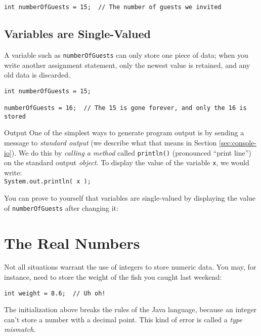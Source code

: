 \begin{verbatim}
int numberOfGuests = 15;  // The number of guests we invited
\end{verbatim}

\subsection{Variables are Single-Valued}

A variable such as \lstinline{numberOfGuests} can only store one piece of data; when you write another assignment statement, only the newest value is retained, and any old data is discarded.

\begin{verbatim}
int numberOfGuests = 15;

numberOfGuests = 16;  // The 15 is gone forever, and only the 16 is stored
\end{verbatim}

\begin{magic}{Output}
One of the simplest ways to generate program output is by sending a message to \textit{standard output} (we describe what that means in Section \ref{sec:console-io}).  We do this by \textit{calling a method} called \lstinline{println()} (pronounced ``print line'') on the standard output \textit{object}.  To display the value of the variable \lstinline{x}, we would write:\\

\texttt{System.out.println( x );}
\end{magic}

You can prove to yourself that variables are single-valued by displaying the value of \texttt{numberOfGuests} after changing it:

\label{code:variables}

\section{The Real Numbers}
\label{sec:double}

Not all situations warrant the use of integers to store numeric data.  You may, for instance, need to store the weight of the fish you caught last weekend:

\begin{verbatim}
int weight = 8.6;  // Uh oh!
\end{verbatim}

The initialization above breaks the rules of the Java language, because an integer can't store a number with a decimal point.  This kind of error is called a \textit{type mismatch}.

